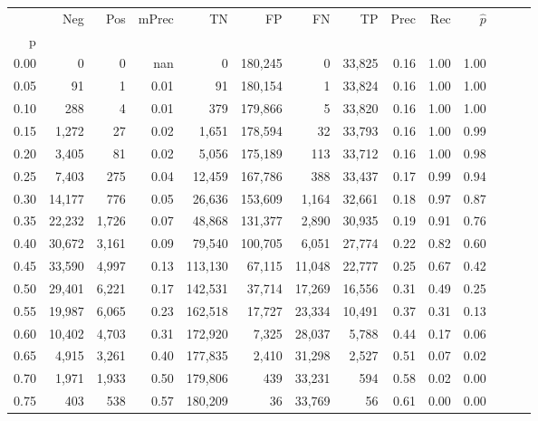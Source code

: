 \begin{tabular}{rrrrrrrrrrrrrr}
\toprule
{} &     Neg &    Pos & mPrec &       TN &       FP &      FN &      TP &  Prec &   Rec & $\hat{p}$ \\
p    &         &        &       &          &          &         &         &       &       &           \\
\midrule
0.00 &       0 &      0 &   nan &        0 &  180,245 &       0 &  33,825 &  0.16 &  1.00 &      1.00 \\
0.05 &      91 &      1 &  0.01 &       91 &  180,154 &       1 &  33,824 &  0.16 &  1.00 &      1.00 \\
0.10 &     288 &      4 &  0.01 &      379 &  179,866 &       5 &  33,820 &  0.16 &  1.00 &      1.00 \\
0.15 &   1,272 &     27 &  0.02 &    1,651 &  178,594 &      32 &  33,793 &  0.16 &  1.00 &      0.99 \\
0.20 &   3,405 &     81 &  0.02 &    5,056 &  175,189 &     113 &  33,712 &  0.16 &  1.00 &      0.98 \\
0.25 &   7,403 &    275 &  0.04 &   12,459 &  167,786 &     388 &  33,437 &  0.17 &  0.99 &      0.94 \\
0.30 &  14,177 &    776 &  0.05 &   26,636 &  153,609 &   1,164 &  32,661 &  0.18 &  0.97 &      0.87 \\
0.35 &  22,232 &  1,726 &  0.07 &   48,868 &  131,377 &   2,890 &  30,935 &  0.19 &  0.91 &      0.76 \\
0.40 &  30,672 &  3,161 &  0.09 &   79,540 &  100,705 &   6,051 &  27,774 &  0.22 &  0.82 &      0.60 \\
0.45 &  33,590 &  4,997 &  0.13 &  113,130 &   67,115 &  11,048 &  22,777 &  0.25 &  0.67 &      0.42 \\
0.50 &  29,401 &  6,221 &  0.17 &  142,531 &   37,714 &  17,269 &  16,556 &  0.31 &  0.49 &      0.25 \\
0.55 &  19,987 &  6,065 &  0.23 &  162,518 &   17,727 &  23,334 &  10,491 &  0.37 &  0.31 &      0.13 \\
0.60 &  10,402 &  4,703 &  0.31 &  172,920 &    7,325 &  28,037 &   5,788 &  0.44 &  0.17 &      0.06 \\
0.65 &   4,915 &  3,261 &  0.40 &  177,835 &    2,410 &  31,298 &   2,527 &  0.51 &  0.07 &      0.02 \\
0.70 &   1,971 &  1,933 &  0.50 &  179,806 &      439 &  33,231 &     594 &  0.58 &  0.02 &      0.00 \\
0.75 &     403 &    538 &  0.57 &  180,209 &       36 &  33,769 &      56 &  0.61 &  0.00 &      0.00 \\

\end{tabular}

